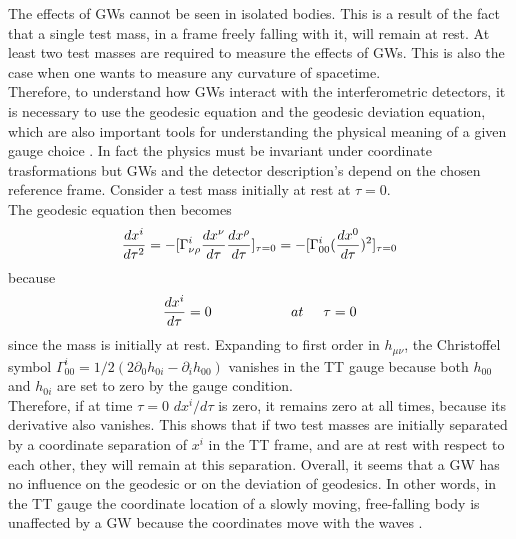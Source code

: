 \documentclass[binding=0.6cm, LaM]{sapthesis}
\begin{document}
	The effects of GWs cannot be seen in isolated bodies. 
	This is a result of the fact that a single test mass, 
	in a frame freely falling with it, will remain at rest.
	At least two test masses are required to measure the effects of GWs. 	
	This is also the case when one wants to measure any curvature of spacetime. \\
        Therefore, to understand how GWs interact with the interferometric detectors,
        it is necessary to use the geodesic equation and the geodesic deviation equation, which are also important tools
        for understanding the physical meaning of a given gauge choice \cite{3}. 
        In fact the physics must be invariant under coordinate trasformations but GWs and the detector description's depend on the chosen reference frame.
        Consider a test mass initially at rest at $\tau = 0$. \\
	The geodesic equation then becomes
                \begin{equation}
                	{{dx^i}\over{d\tau^2}} = -[\Gamma^i_{\nu\rho}{{dx^{\nu}}\over{d\tau}}{{dx^{\rho}}\over{d\tau}}]_{\tau=0} \\ 
                			       = - [ \Gamma^i_{00}({{dx^0}\over{d\tau}})^2]_{\tau=0}
                \end{equation}
        because
                \begin{equation}
                	{{dx^i}\over{d\tau}} = 0 \hspace*{2cm} at \hspace*{0.5cm}\tau = 0
                \end{equation}
        since the mass is initially at rest. Expanding to first order in $h_{\mu\nu}$,
        the Christoffel symbol $\Gamma^i_{00} = 1/2(2\partial_{0}h_{0i} - \partial_i h_{00})$ vanishes in the TT gauge
        because both $h_{00}$ and $h_{0i}$ are set to zero by the gauge condition. \\
        Therefore, if at time $\tau = 0$ $dx^i/d\tau$ is zero, it remains zero at all times,
        because its derivative also vanishes.
        This shows that if two test masses are initially separated by a coordinate separation of $x^i$ in the TT frame,
        and are at rest with respect to each other, they will remain at this separation.
        Overall, it seems that a GW has no influence on the geodesic or on the deviation of geodesics. 
        In other words, in the TT gauge the coordinate location of a slowly moving, free-falling body is unaffected
        by a GW because the coordinates move with the waves \cite{4}. \\
\end{document}
